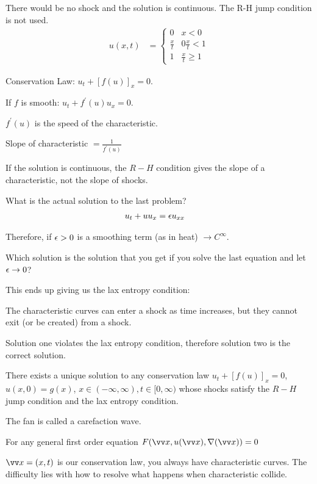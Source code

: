 \documentclass{article}
\begin{document}
There would be no shock and the solution is continuous. The R-H jump condition is not used.
%
\begin{align}
  u(x, t) & =
  \begin{cases}
    0 & x < 0\\
    \frac{x}{t} & 0 \frac{x}{t} < 1\\
    1 & \frac{x}{t} \geq 1
  \end{cases}
\end{align}

Conservation Law: $u_t + [f(u)]_x = 0$.

If $f$ is smooth: $u_t + f^\prime(u) u_x = 0$.

$f^\prime(u)$ is the speed of the characteristic.

Slope of characteristic $= \frac{1}{f^\prime(u)}$

\note If the solution is continuous, the $R-H$ condition gives the slope of a characteristic, not the slope of shocks.

What is the actual solution to the last problem?
%
\begin{align}
  u_t + u u_x & = \epsilon u_{xx}
\end{align}

Therefore, if $\epsilon > 0$ is a smoothing term (as in heat) $\to C^\infty$.

Which solution is the solution that you get if you solve the last equation and let $\epsilon \to 0$?

This ends up giving us the lax entropy condition:

The characteristic curves can enter a shock as time increases, but they cannot exit (or be created) from a shock.

Solution one violates the lax entropy condition, therefore solution two is the correct solution.

\thm There exists a unique solution to any conservation law $u_t + [f(u)]_x = 0$, $u(x, 0) = g(x)$, $x \in (-\infty, \infty), t \in [0, \infty)$ whose shocks satisfy the $R-H$ jump condition and the lax entropy condition.

\note The fan is called a carefaction wave.

For any general first order equation $F(\vv x, u(\vv x), \grad(\vv x)) = 0$

$\vv x = (x, t)$ is our conservation law, you always have characteristic curves. The difficulty lies with how to resolve what happens when characteristic collide.
\end{document}
